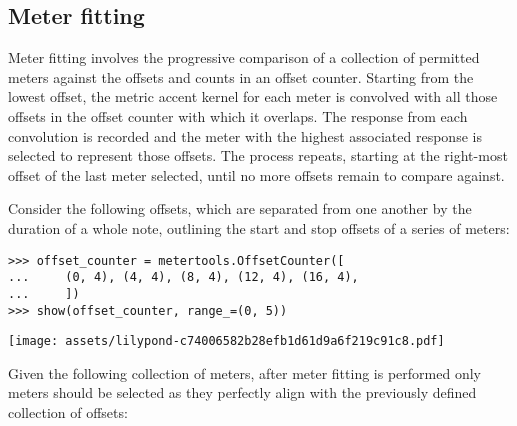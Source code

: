 \subsection{Meter fitting} %
\label{ssec:meter-fitting}

Meter fitting involves the progressive comparison of a collection of permitted
meters against the offsets and counts in an offset counter. Starting from the
lowest offset, the metric accent kernel for each meter is convolved with all
those offsets in the offset counter with which it overlaps. The response from
each convolution is recorded and the meter with the highest associated response
is selected to represent those offsets. The process repeats, starting at the
right-most offset of the last meter selected, until no more offsets remain to
compare against.

Consider the following offsets, which are separated from one another by the
duration of a whole note, outlining the start and stop offsets of a series of
 meters:

\begin{comment}
<abjad>
offset_counter = metertools.OffsetCounter([
    (0, 4), (4, 4), (8, 4), (12, 4), (16, 4),
    ])
show(offset_counter, range_=(0, 5))
</abjad>
\end{comment}

\begin{abjadbookoutput}
\begin{singlespacing}
\vspace{-0.5\baselineskip}
\begin{verbatim}
>>> offset_counter = metertools.OffsetCounter([
...     (0, 4), (4, 4), (8, 4), (12, 4), (16, 4),
...     ])
>>> show(offset_counter, range_=(0, 5))
\end{verbatim}
\noindent\texttt{[image: assets/lilypond-c74006582b28efb1d61d9a6f219c91c8.pdf]}
\end{singlespacing}
\end{abjadbookoutput}

\noindent Given the following collection of meters, after meter fitting is
performed only  meters should be selected as they perfectly align
with the previously defined collection of offsets:

\begin{comment}
<abjad>
permitted_meters = metertools.MeterInventory([(3, 4), (4, 4), (5, 4)])
show(permitted_meters, range_=(0, 5))
fitted_meters = metertools.Meter.fit_meters_to_expr(
    expr=offset_counter,
    meters=permitted_meters,
    )
show(fitted_meters, range_=(0, 5))
</abjad>
\end{comment}

